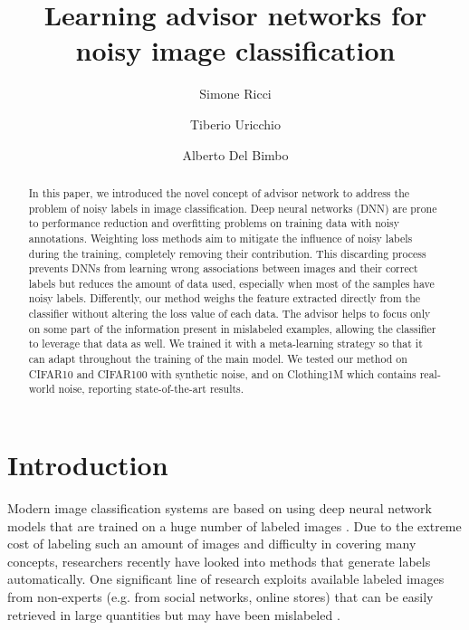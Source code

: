 \documentclass[runningheads]{llncs}
\begin{document}
\title{Learning advisor networks for noisy image classification}




	\author{Simone Ricci  \and
		Tiberio Uricchio  \and
		Alberto Del Bimbo  
	}
\maketitle              \begin{abstract}
		
		In this paper, we introduced the novel concept of advisor network to address the problem of noisy labels in image classification. Deep neural networks (DNN) are prone to performance reduction and overfitting problems on training data with noisy annotations. Weighting loss methods aim to mitigate the influence of noisy labels during the training, completely removing their contribution. This discarding process prevents DNNs from learning wrong associations between images and their correct labels but reduces the amount of data used, especially when most of the samples have noisy labels. Differently, our method weighs the feature extracted directly from the classifier without altering the loss value of each data. The advisor helps to focus only on some part of the information present in mislabeled examples, allowing the classifier to leverage that data as well. We trained it with a meta-learning strategy so that it can adapt throughout the training of the main model. We tested our method on CIFAR10 and CIFAR100 with synthetic noise, and on Clothing1M which contains real-world noise, reporting state-of-the-art results.
		
	\end{abstract}
\section{Introduction}
	Modern image classification systems are based on using deep neural network models that are trained on a huge number of labeled images \cite{krizhevsky2012imagenet}. Due to the extreme cost of labeling such an amount of images and difficulty in covering many concepts, researchers recently have looked into methods that generate labels automatically. One significant line of research exploits available labeled images from non-experts (e.g. from social networks, online stores) that can be easily retrieved in large quantities but may have been mislabeled \cite{algan2021image}.
	
\end{document}
